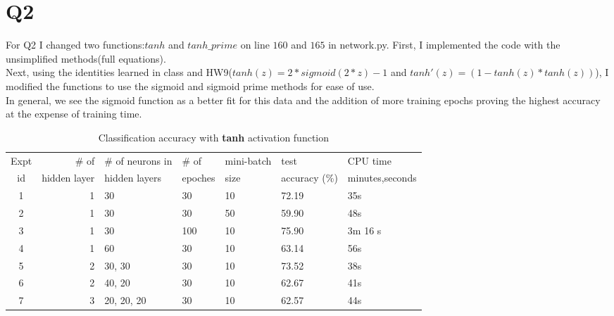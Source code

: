 \documentclass[11pt]{article}
\begin{document}
\section{Q2}
For Q2 I changed two functions:$tanh$ and $tanh\_prime$ on line $160$ and $165$ in network.py. First, I implemented the code with the unsimplified methods(full equations).\\ Next, using the identities learned in class and HW9($tanh(z) = 2*sigmoid(2*z) -1$ and $tanh' (z)= (1-tanh(z)*tanh(z))$), I modified the functions to use the sigmoid and sigmoid prime methods for ease of use. \\ In general, we see the sigmoid function as a better fit for this data and the addition of more training epochs proving the highest accuracy at the expense of training time.
\begin{table}[h]
\centering
\caption{Classification accuracy with {\bf tanh} activation function}
\label{table1}
  \begin{tabular}{|c|r|l|l|l|l|l|} \hline
    Expt & \# of          & \# of neurons in & \# of    & mini-batch & test  & CPU time   \\  
    id   &  hidden layer  & hidden layers    & epoches & size       & accuracy (\%) & minutes,seconds \\ \hline
    1   &  1              &  30              &  30     &  10       &  72.19   & 35s\\ \hline
    2   &  1              &  30              &  30     &  50       &  59.90   & 48s\\ \hline
    3   &  1              &  30              &  100    &  10       &  75.90   & 3m 16 s \\ \hline
    4   &  1              &  60              &  30     &  10       &  63.14   & 56s \\ \hline
    5   &  2              &  30, 30          &  30     &  10       &  73.52   & 38s\\ \hline
    6   &  2              &  40, 20          &  30     &  10       &  62.67   & 41s \\ \hline 
    7   &  3              &  20, 20, 20      &  30     &  10       &  62.57   & 44s\\ \hline
  \end{tabular}
\end{table}
\end{document}
